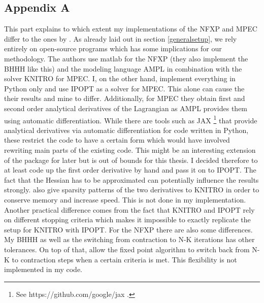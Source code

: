 

\thispagestyle{plain} %

\subsection{Appendix A} \label{appendixA}
\thispagestyle{plain} %

This part explains to which extent my implementations of the NFXP and MPEC differ to the ones by \cite{Iskhakov.2016}. As already laid out in section \ref{generalsetup}, we rely entirely on open-source programs which has some implications for our methodology. The authors use matlab for the NFXP (they also implement the BHHH like this) and the modeling language AMPL in combination with the solver KNITRO for MPEC. I, on the other hand, implement everything in Python only and use IPOPT as a solver for MPEC. This alone can cause the their results and mine to differ. Additionally, for MPEC they obtain first and second order analytical derivatives of the Lagrangian as AMPL provides them using automatic differentiation. While there are tools such as JAX \footnote{See https://github.com/google/jax .} that provide analytical derivatives via automatic differentiation for code written in Python, these restrict the code to have a certain form which would have involved rewriting main parts of the existing code. This might be an interesting extension of the package for later but is out of bounds for this thesis. I decided therefore to at least code up the first order derivative by hand and pass it on to IPOPT. The fact that the Hessian has to be approximated can potentially influence the results strongly. \citeauthor{Iskhakov.2016} also give sparsity patterns of the two derivatives to KNITRO in order to conserve memory and increase speed. This is not done in my implementation. Another practical difference comes from the fact that KNITRO and IPOPT rely on different stopping criteria which makes it impossible to exactly replicate the setup for KNITRO with IPOPT. For the NFXP there are also some differences. My BHHH as well as the switching from contraction to N-K iterations has other tolerances. On top of that, \citeauthor{Iskhakov.2016} allow the fixed point algorithm to switch back from N-K to contraction steps when a certain criteria is met. This flexibility is not implemented in my code.

